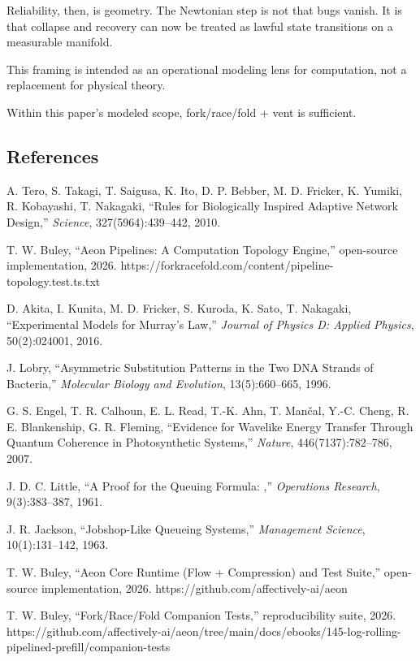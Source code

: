 \documentclass[
]{article}
\begin{document}
Reliability, then, is geometry. The Newtonian step is not that bugs
vanish. It is that collapse and recovery can now be treated as lawful
state transitions on a measurable manifold.

This framing is intended as an operational modeling lens for
computation, not a replacement for physical theory.

Within this paper's modeled scope, fork/race/fold + vent is sufficient.

\subsection{\texorpdfstring{\textbf{References}}{References}}\label{references}

A. Tero, S. Takagi, T. Saigusa, K. Ito, D. P. Bebber, M. D. Fricker, K.
Yumiki, R. Kobayashi, T. Nakagaki, ``Rules for Biologically Inspired
Adaptive Network Design,'' \emph{Science}, 327(5964):439--442, 2010.

T. W. Buley, ``Aeon Pipelines: A Computation Topology Engine,''
open-source implementation, 2026.
https://forkracefold.com/content/pipeline-topology.test.ts.txt

D. Akita, I. Kunita, M. D. Fricker, S. Kuroda, K. Sato, T. Nakagaki,
``Experimental Models for Murray's Law,'' \emph{Journal of Physics D:
Applied Physics}, 50(2):024001, 2016.

J. Lobry, ``Asymmetric Substitution Patterns in the Two DNA Strands of
Bacteria,'' \emph{Molecular Biology and Evolution}, 13(5):660--665,
1996.

G. S. Engel, T. R. Calhoun, E. L. Read, T.-K. Ahn, T. Mančal, Y.-C.
Cheng, R. E. Blankenship, G. R. Fleming, ``Evidence for Wavelike Energy
Transfer Through Quantum Coherence in Photosynthetic Systems,''
\emph{Nature}, 446(7137):782--786, 2007.

J. D. C. Little, ``A Proof for the Queuing Formula: ,'' \emph{Operations
Research}, 9(3):383--387, 1961.

J. R. Jackson, ``Jobshop-Like Queueing Systems,'' \emph{Management
Science}, 10(1):131--142, 1963.

T. W. Buley, ``Aeon Core Runtime (Flow + Compression) and Test Suite,''
open-source implementation, 2026. https://github.com/affectively-ai/aeon

T. W. Buley, ``Fork/Race/Fold Companion Tests,'' reproducibility suite,
2026.
https://github.com/affectively-ai/aeon/tree/main/docs/ebooks/145-log-rolling-pipelined-prefill/companion-tests
\end{document}
